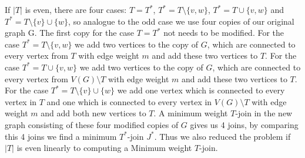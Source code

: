 \documentclass{article}
\begin{document}
  If $|T|$ is even, there are four cases: $T=T^*$, $T^*=T\setminus\{v,w\}$, $T^*=T\cup\{v,w\}$ and $T^*=T\setminus\{v\}\cup\{w\}$, so analogue to the odd case we use four copies of our original graph G. The first copy for the case $T=T^*$ not needs to be modified. For the case $T^*=T\setminus\{v,w\}$ we add two vertices to the copy of $G$, which are connected to every vertex from $T$ with edge weight $m$ and add these two vertices to $T$.
  For the case $T^*=T\cup\{v,w\}$ we add two vertices to the copy of $G$, which are connected to every vertex from $V(G)\setminus T$ with edge weight $m$ and add these two vertices to $T$. For the case $T^*=T\setminus\{v\}\cup\{w\}$ we add one vertex which is connected to every vertex in $T$ and one which is connected to every vertex in $V(G)\setminus T$ with edge weight $m$ and add both new vertices to $T$.
  A minimum weight $T$-join in the new graph consisting of these four modified copies of $G$ gives us 4 joins, by comparing this 4 joins we find a minimum $T^*$-join $J^*$. Thus we  also reduced the problem if $|T|$ is even linearly to computing a Minimum weight $T$-join.
\end{document}
